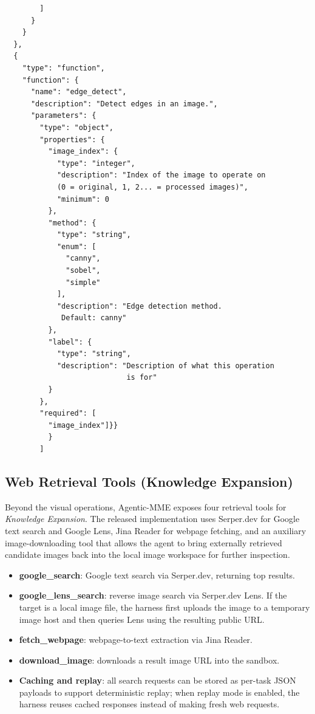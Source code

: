 \documentclass[runningheads]{llncs}
\theoremstyle{plain}
\theoremstyle{definition}
\theoremstyle{remark}
\begin{document}
\begin{tcolorbox}
\begin{verbatim}
        ]
      }
    }
  },
  {
    "type": "function",
    "function": {
      "name": "edge_detect",
      "description": "Detect edges in an image.",
      "parameters": {
        "type": "object",
        "properties": {
          "image_index": {
            "type": "integer",
            "description": "Index of the image to operate on
            (0 = original, 1, 2... = processed images)",
            "minimum": 0
          },
          "method": {
            "type": "string",
            "enum": [
              "canny",
              "sobel",
              "simple"
            ],
            "description": "Edge detection method.
             Default: canny"
          },
          "label": {
            "type": "string",
            "description": "Description of what this operation
                            is for"
          }
        },
        "required": [
          "image_index"]}}
          } 
        ]

\end{verbatim}
\end{tcolorbox}

\subsection{Web Retrieval Tools (Knowledge Expansion)}
\label{app:web_tools}

Beyond the visual operations, Agentic-MME exposes four retrieval tools for \emph{Knowledge Expansion}. The released implementation uses Serper.dev for Google text search and Google Lens, Jina Reader for webpage fetching, and an auxiliary image-downloading tool that allows the agent to bring externally retrieved candidate images back into the local image workspace for further inspection. 

\begin{itemize}[leftmargin=*,itemsep=-0.1em,topsep=0.1em]
  \renewcommand\labelitemi{$\diamond$}  
    \item \textbf{google\_search}: Google text search via Serper.dev, returning top results.
    \item \textbf{google\_lens\_search}: reverse image search via Serper.dev Lens. If the target is a local image file, the harness first uploads the image to a temporary image host and then queries Lens using the resulting public URL.
    \item \textbf{fetch\_webpage}: webpage-to-text extraction via Jina Reader.
    \item \textbf{download\_image}: downloads a result image URL into the sandbox.
    \item \textbf{Caching and replay}: all search requests can be stored as per-task JSON payloads to support deterministic replay; when replay mode is enabled, the harness reuses cached responses instead of making fresh web requests.
\end{itemize}
\end{document}
